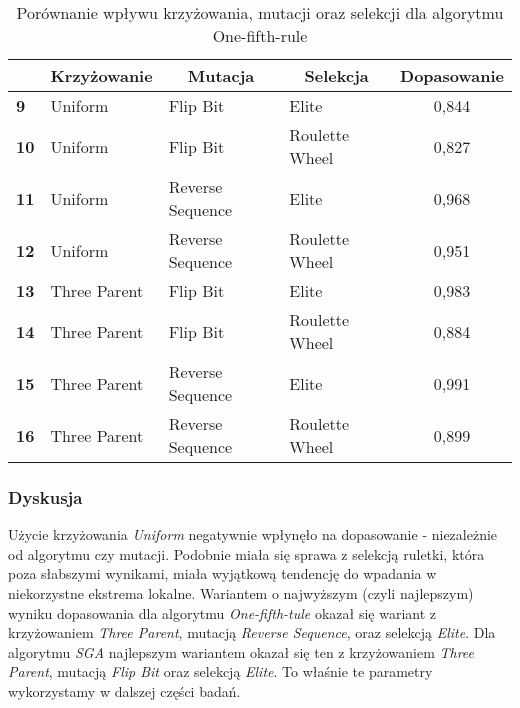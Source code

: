 \documentclass{classrep}
\begin{document}
\begin{table}[H]
\begin{tabular}{|l|l|l|l|c|}
\hline
           & \multicolumn{1}{c|}{\textbf{Krzyżowanie}} & \multicolumn{1}{c|}{\textbf{Mutacja}} & \multicolumn{1}{c|}{\textbf{Selekcja}} & \textbf{Dopasowanie} \\ \hline
\textbf{9} & Uniform                                   & Flip Bit                              & Elite                                  & 0,844                \\ \hline
\textbf{10} & Uniform                                   & Flip Bit                              & Roulette Wheel                         & 0,827                \\ \hline
\textbf{11} & Uniform                                   & Reverse Sequence                      & Elite                                  & 0,968                \\ \hline
\textbf{12} & Uniform                                   & Reverse Sequence                      & Roulette Wheel                         & 0,951                \\ \hline
\textbf{13} & Three Parent                              & Flip Bit                              & Elite                                  & 0,983                \\ \hline
\textbf{14} & Three Parent                              & Flip Bit                              & Roulette Wheel                         & 0,884                \\ \hline
\textbf{15} & Three Parent                              & Reverse Sequence                      & Elite                                  & 0,991                \\ \hline
\textbf{16} & Three Parent                              & Reverse Sequence                      & Roulette Wheel                         & 0,899                \\ \hline
\end{tabular}
\caption{Porównanie wpływu krzyżowania, mutacji oraz selekcji dla algorytmu One-fifth-rule}
\label{tab:calc2}
\end{table}


\subsubsection*{Dyskusja}
Użycie krzyżowania \textit{Uniform} negatywnie wpłynęło na dopasowanie - niezależnie od algorytmu czy mutacji. Podobnie miała się sprawa z selekcją ruletki, która poza słabszymi wynikami, miała wyjątkową tendencję do wpadania w niekorzystne ekstrema lokalne. Wariantem o najwyższym (czyli najlepszym) wyniku dopasowania dla algorytmu \textit{One-fifth-tule} okazał się wariant z krzyżowaniem \textit{Three Parent}, mutacją \textit{Reverse Sequence}, oraz selekcją \textit{Elite}. Dla algorytmu \textit{SGA} najlepszym wariantem okazał się ten z krzyżowaniem \textit{Three Parent}, mutacją \textit{Flip Bit} oraz selekcją \textit{Elite}. To właśnie te parametry wykorzystamy w dalszej części badań.
\end{document}
